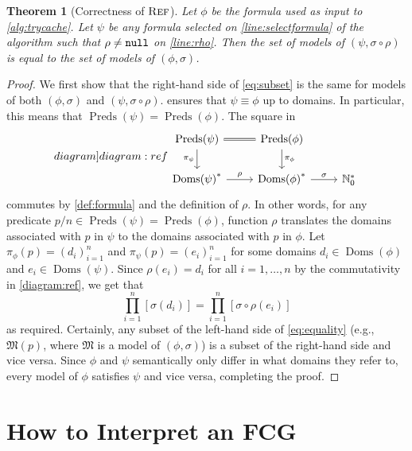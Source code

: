 \documentclass{article}
\newtheorem{theorem}{Theorem}
\theoremstyle{definition}
\DeclareMathOperator{\Reff}{\textsc{Ref}}
\DeclareMathOperator{\Doms}{Doms}
\DeclareMathOperator{\Preds}{Preds}
\begin{document}
\begin{theorem}[Correctness of $\Reff$]
  Let $\phi$ be the formula used as input to \cref{alg:trycache}. Let $\psi$ be
  any formula selected on \cref{line:selectformula} of the algorithm such that
  $\rho \ne {\normalfont\texttt{null}}$ on \cref{line:rho}. Then the set of
  models of $(\psi, \sigma \circ \rho)$ is equal to the set of models of
  $(\phi, \sigma)$.
\end{theorem}
\begin{proof}
  We first show that the right-hand side of \cref{eq:subset} is the same for
  models of both $(\phi, \sigma)$ and $(\psi, \sigma \circ \rho)$.
   ensures that $\psi \equiv \phi$ up to domains. In
  particular, this means that $\Preds(\psi) = \Preds(\phi)$. The square in
  \begin{equation}\label[diagram]{diagram:ref}
    \begin{tikzcd}
      \Preds(\psi) \ar[equal]{r} \ar[d, swap, "\pi_{\psi}"] & \Preds(\phi) \ar[d, "\pi_{\phi}"] \\
      {\Doms(\psi)}^{\ast} \ar[r, "\rho"] & {\Doms(\phi)}^{\ast} \ar[r, "\sigma"] & \mathbb{N}_{0}^{\ast}
    \end{tikzcd}
  \end{equation}
  commutes by \cref{def:formula} and the definition of $\rho$. In other words,
  for any predicate $p/n \in \Preds(\psi) = \Preds(\phi)$, function $\rho$
  translates the domains associated with $p$ in $\psi$ to the domains associated
  with $p$ in $\phi$. Let $\pi_{\phi}(p) = {(d_{i})}_{i=1}^{n}$ and
  $\pi_{\psi}(p) = {(e_{i})}_{i=1}^{n}$ for some domains $d_{i} \in \Doms(\phi)$
  and $e_{i} \in \Doms(\psi)$. Since $\rho(e_{i}) = d_{i}$ for all
  $i = 1, \dots, n$ by the commutativity in \cref{diagram:ref}, we get that
  \begin{equation}\label{eq:equality}
    \prod_{i=1}^{n}[\sigma(d_{i})] = \prod_{i=1}^{n}[\sigma \circ \rho(e_{i})]
  \end{equation}
  as required. Certainly, any subset of the left-hand side of \cref{eq:equality}
  (e.g., $\mathfrak{M}(p)$, where $\mathfrak{M}$ is a model of $(\phi, \sigma)$)
  is a subset of the right-hand side and vice versa. Since $\phi$ and $\psi$
  semantically only differ in what domains they refer to, every model of $\phi$
  satisfies $\psi$ and vice versa, completing the proof.
\end{proof}

\section{How to Interpret an FCG}\label{sec:interpret}
\end{document}
